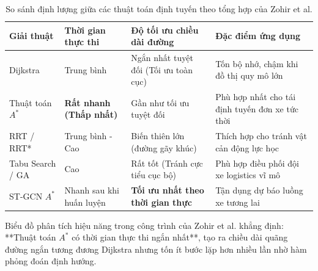 \documentclass[a4paper]{article}
\begin{document}
\begin{table}[H]
    \centering
    \small
    \begin{tabularx}{\textwidth}{|p{2.6cm}|X|X|p{2.8cm}|}
        \hline
        \textbf{Giải thuật} & \textbf{Thời gian thực thi} & \textbf{Độ tối ưu chiều dài đường} & \textbf{Đặc điểm ứng dụng} \\
        \hline
        Dijkstra & Trung bình & Ngắn nhất tuyệt đối (Tối ưu toàn cục) & Tốn bộ nhớ, chậm khi đồ thị quy mô lớn \\
        \hline
        Thuật toán $A^*$ & \textbf{Rất nhanh (Thấp nhất)} & Gần như tối ưu tuyệt đối & Phù hợp nhất cho tái định tuyến đơn xe tức thời \\
        \hline
        RRT / RRT* & Trung bình - Cao & Biến thiên lớn (đường gãy khúc) & Thích hợp cho tránh vật cản động lực học \\
        \hline
        Tabu Search / GA & Cao & Rất tốt (Tránh cực tiểu cục bộ) & Phù hợp điều phối đội xe logistics vĩ mô \\
        \hline
        ST-GCN $A^*$ & Nhanh sau khi huấn luyện & \textbf{Tối ưu nhất theo thời gian thực} & Tận dụng dự báo luồng xe tương lai \\
        \hline
    \end{tabularx}
    \caption{So sánh định lượng giữa các thuật toán định tuyến theo tổng hợp của Zohir et al.}
    \label{tab:algorithm_comparison}
\end{table}

Biểu đồ phân tích hiệu năng trong công trình của Zohir et al. khẳng định: **Thuật toán $A^*$ có thời gian thực thi ngắn nhất**, tạo ra chiều dài quãng đường ngắn tương đương Dijkstra nhưng tốn ít bước lặp hơn nhiều lần nhờ hàm phỏng đoán định hướng.
\end{document}
